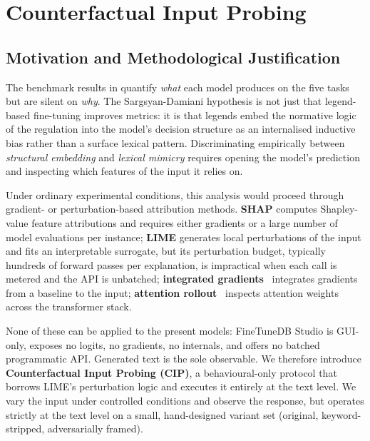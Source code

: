 \documentclass[pdflatex, sn-apa]{sn-jnl}%
\theoremstyle{thmstyleone}%
\theoremstyle{thmstyletwo}%
\theoremstyle{thmstylethree}%
\begin{document}
\FloatBarrier

\section{Counterfactual Input Probing}
\label{sec:cip}

\subsection{Motivation and Methodological Justification}
\label{sec:cip:motivation}

The benchmark results in  quantify \emph{what} each model
produces on the five tasks but are silent on \emph{why}. The Sargsyan-Damiani
hypothesis is not just that legend-based fine-tuning improves metrics: it is
that legends embed the normative logic of the regulation into the model's
decision structure as an internalised inductive bias rather than a surface
lexical pattern. Discriminating empirically between \emph{structural embedding}
and \emph{lexical mimicry} requires opening the model's prediction and
inspecting which features of the input it relies on.

Under ordinary experimental conditions, this analysis would proceed through
gradient- or perturbation-based attribution methods. \textbf{SHAP}
\citep{lundberg2017shap} computes Shapley-value feature attributions and
requires either gradients or a large number of model evaluations per instance;
\textbf{LIME} \citep{ribeiro2016lime} generates local perturbations of the input
and fits an interpretable surrogate, but its perturbation budget, typically
hundreds of forward passes per explanation, is impractical when each call is
metered and the API is unbatched; \textbf{integrated
gradients}~\citep{sundararajan2017ig} integrates gradients from a baseline to
the input; \textbf{attention rollout}~\citep{abnar2020rollout} inspects
attention weights across the transformer stack. 

None of these can be applied to the present models: FineTuneDB Studio is
GUI-only, exposes no logits, no gradients, no internals, and offers no batched
programmatic API. Generated text is the sole observable. We therefore introduce
\textbf{Counterfactual Input Probing (CIP)}, a behavioural-only protocol that
borrows LIME's perturbation logic and executes it entirely at the text level. We
vary the input under controlled conditions and observe the response, but
operates strictly at the text level on a small, hand-designed variant set
(original, keyword-stripped, adversarially framed).
\end{document}

